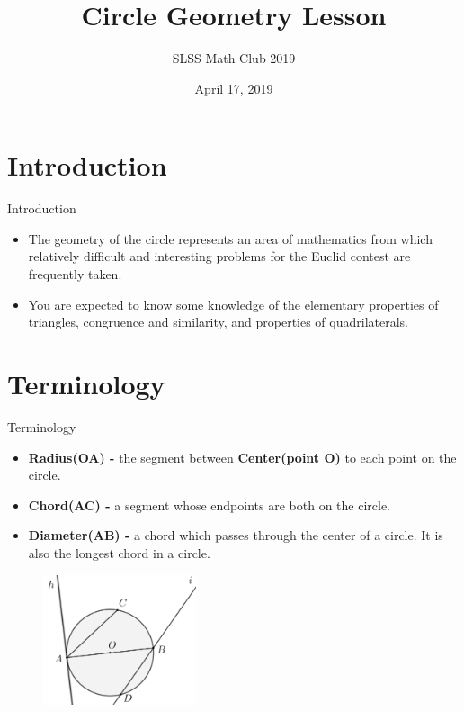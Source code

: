 \documentclass{beamer}
\title{Circle Geometry Lesson}
\author{SLSS Math Club 2019}
\date{April 17, 2019}
\begin{document}
\frame{\titlepage}

\section{Introduction}
	\begin{frame}{Introduction}
	\begin{itemize}
	    \item The geometry of the circle represents an area of mathematics from which relatively
	    difficult and interesting problems for the Euclid contest are frequently taken. \\
	    \item You are expected to know some knowledge of the elementary properties of triangles, congruence and similarity, and properties of quadrilaterals.
	\end{itemize}
	\end{frame}
	
\section{Terminology}
\small
	\begin{frame}{Terminology}
	\begin{itemize}
		\item \textbf{Radius(OA) - } the segment between \textbf{Center(point O)} to each point on the circle. 
		\item \textbf{Chord(AC) - } a segment whose endpoints are both on the circle. 
		\item \textbf{Diameter(AB) - } a chord which passes through the center of a circle. It is also the longest chord in a circle. 
	\end{itemize}
	\begin{figure}[h!]
		\centering
		\includegraphics[width=0.4\textwidth]{Graphics/Week_13/GeometryDiagram.png}
		\label{fig: 2.1}
	\end{figure}
\end{frame}
\end{document}
